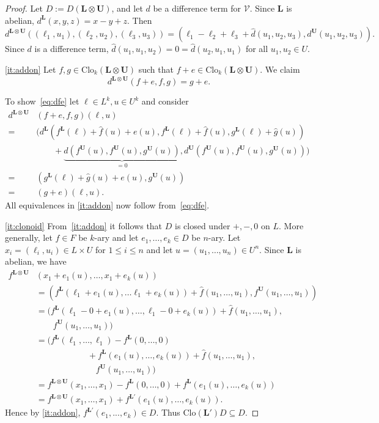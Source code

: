 \documentclass[12pt]{amsart}
\numberwithin{equation}{section}
\theoremstyle{plain}
\theoremstyle{definition}
\renewcommand{\L}{\mathbf{L}}
\newcommand{\U}{\mathbf{U}}
\newcommand{\V}{\mathcal{V}}
\newcommand{\Clo}{\mathrm{Clo}}
\begin{document}
\begin{proof}
  Let $D := D(\L\otimes\U)$, and let $d$ be a difference term for $\V$.
  Since $\L$ is abelian, $d^\L(x,y,z) = x-y+z$.
  Then \[d^{\L \otimes \U}((\ell_1,u_1),(\ell_2,u_2),(\ell_3,u_3)) = (\ell_1-\ell_2+\ell_3 + \hat{d}(u_1,u_2,u_3), d^\U(u_1,u_2,u_3)).\]
  Since $d$ is a difference term, $\hat{d}(u_1,u_1,u_2) = 0 = \hat{d}(u_2,u_1,u_1)$ for all $u_1,u_2\in U$.

  \eqref{it:addon}
    Let $f,g\in\Clo_k(\L\otimes\U)$ such that $f+e\in\Clo_k(\L\otimes\U)$. 
    We claim 
      \begin{equation} \label{eq:dfe}
        d^{\L\otimes\U}(f+e,f,g) = g+e.
      \end{equation}

  To show~\eqref{eq:dfe} let $\ell\in L^k,u\in U^k$ and consider 
    \begin{align*}
      d^{\L\otimes\U}&(f+e,f,g) (\ell,u)  \\
      = & (d^\L(f^\L(\ell)+\hat{f}(u)+e(u),f^\L(\ell)+\hat{f}(u),g^\L(\ell)+\hat{g}(u)) \\
      & \quad \quad +\underbrace{\hat{d}(f^\U(u),f^\U(u),g^\U(u))}_{=0},  d^\U(f^\U(u),f^\U(u),g^\U(u)) ) \\
      = & (g^\L(\ell)+\hat{g}(u)+e(u), g^\U(u)) \\
      =  & (g+e)(\ell,u). 
    \end{align*}
  All equivalences in \eqref{it:addon} now follow from~\eqref{eq:dfe}.


  \eqref{it:clonoid}
    From~\eqref{it:addon} it follows that $D$ is closed under $+,-,0$ on $L$. 
    More generally, let $f\in F$ be $k$-ary  and
      let $e_1,\dots,e_k\in D$ be $n$-ary. 
    Let $x_i = (\ell_i, u_i) \in L \times U$ for $1 \le i \le n$ and let $u = (u_1, \dots, u_n) \in U^n$.
    Since $\L$ is abelian, we have
    \begin{align*}
      f^{\L\otimes \U} & (x_1+e_1(u), \dots, x_1 +e_k(u)) \\
      &= ( f^\L(\ell_1 + e_1(u), \dots \ell_1 + e_k(u)) + \hat{f}(u_1, \dots, u_1) , f^\U(u_1, \dots, u_1) ) \\
      & =  ( f^\L(\ell_1 - 0 + e_1(u), \dots , \ell_1 - 0 + e_k(u)) + \hat{f}(u_1, \dots, u_1) , \\
      & \quad \quad f^\U(u_1, \dots, u_1) ) \\ 
      & = ( f^\L(\ell_1, \dots, \ell_1) - f^\L(0, \dots, 0)  \\
      & \hspace{1in}+ f^\L(e_1(u), \dots, e_k(u)) + \hat{f}(u_1, \dots, u_1), \\
      & \quad \quad \quad \quad \quad \quad \quad f^\U(u_1, \dots, u_1))\\
      & =  f^{\L\otimes \U} (x_1, \dots, x_1) - f^\L(0, \dots, 0) + f^\L(e_1(u), \dots, e_k(u)) \\
      &  = f^{\L\otimes \U} (x_1, \dots, x_1)  +f^{\L'} (e_1(u), \dots ,e_k(u)).
    \end{align*}
  Hence by \eqref{it:addon},
    $f^{\L'} (e_1,...,e_k) \in D$.
  Thus $\Clo(\L')D \subseteq D$.


\end{proof}
\end{document}
